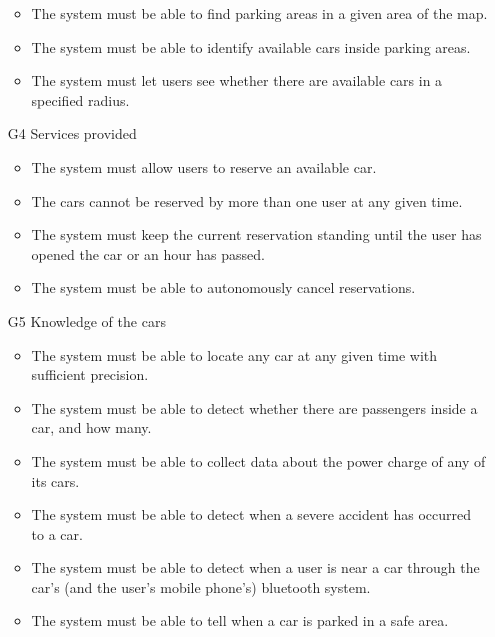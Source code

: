 \begin{itemize}
\begin{itemize}
						\item The system must be able to find parking areas in a given area of the map. 
						\item The system must be able to identify available cars inside parking areas.
						\item The system must let users see whether there are available cars in a specified radius. 
					\end{itemize}
				\item [G4] Services provided %
					\begin{itemize}
						\item The system must allow users to reserve an available car.
						\item The cars cannot be reserved by more than one user at any given time.
						\item The system must keep the current reservation standing until the user has opened the car or an hour has passed.
						\item The system must be able to autonomously cancel reservations.
					\end{itemize}
				\item [G5] Knowledge of the cars %
					\begin{itemize}
						\item The system must be able to locate any car at any given time with sufficient precision.
						\item The system must be able to detect whether there are passengers inside a car, and how many.
						\item The system must be able to collect data about the power charge of any of its cars.
						\item The system must be able to detect when a severe accident has occurred to a car. %
						\item The system must be able to detect when a user is near a car through the car's (and the user's mobile phone's) bluetooth system.
						\item The system must be able to tell when a car is parked in a safe area.

\end{itemize}
\end{itemize}
